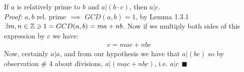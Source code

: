 \begin{lemma}
If $a$ is relatively prime to $b$ and $a|(b\cdot c)$, then $a|c$. \\
\textit{Proof:} $a,b$ rel. prime $\implies$ $GCD(a,b)=1$, by Lemma 1.3.1 $\exists m,n \in {\mathbb{ Z}} \ni 1= GCD(a,b)=ma+nb$. Now if we multiply both sides of this expression by $c$ we have:
\begin{align}
    c=mac+nbc\nonumber
\end{align}
Now, certainly $a|a$, and from our hypothesis we have that $a|(bc)$ so by observation \# 4 about divisions, $a|(m\underline{a}c+ n\underline{bc})$, i.e. $a|c \ \ \blacksquare$ \steezybreak\\
\end{lemma}
